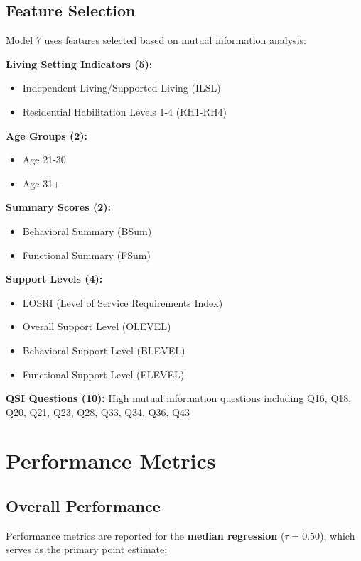 \subsection{Feature Selection}

Model 7 uses \ModelSevenNumFeatures{} features selected based on mutual information analysis:

\textbf{Living Setting Indicators (5):}
\begin{itemize}
\item Independent Living/Supported Living (ILSL)
\item Residential Habilitation Levels 1-4 (RH1-RH4)
\end{itemize}

\textbf{Age Groups (2):}
\begin{itemize}
\item Age 21-30
\item Age 31+
\end{itemize}

\textbf{Summary Scores (2):}
\begin{itemize}
\item Behavioral Summary (BSum)
\item Functional Summary (FSum)
\end{itemize}

\textbf{Support Levels (4):}
\begin{itemize}
\item LOSRI (Level of Service Requirements Index)
\item Overall Support Level (OLEVEL)
\item Behavioral Support Level (BLEVEL)
\item Functional Support Level (FLEVEL)
\end{itemize}

\textbf{QSI Questions (10):}
High mutual information questions including Q16, Q18, Q20, Q21, Q23, Q28, Q33, Q34, Q36, Q43

\section{Performance Metrics}

\subsection{Overall Performance}

Performance metrics are reported for the \textbf{median regression} ($\tau = 0.50$), which serves as the primary point estimate:

